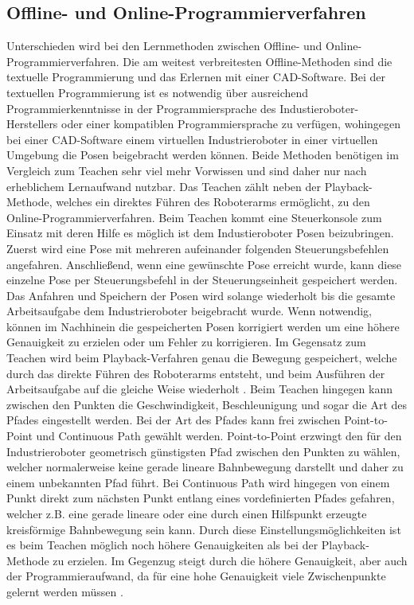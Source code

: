 \subsection{Offline- und Online-Programmierverfahren}
Unterschieden wird bei den Lernmethoden zwischen Offline- und Online-Programmierverfahren. Die am weitest verbreitesten Offline-Methoden sind die textuelle Programmierung und das Erlernen mit einer CAD-Software. Bei der textuellen Programmierung ist es notwendig über ausreichend Programmierkenntnisse in der Programmiersprache des Industieroboter-Herstellers oder einer kompatiblen Programmiersprache zu verfügen, wohingegen bei einer CAD-Software einem virtuellen Industrieroboter in einer virtuellen Umgebung die Posen beigebracht werden können. Beide Methoden benötigen im Vergleich zum Teachen sehr viel mehr Vorwissen und sind daher nur nach erheblichem Lernaufwand nutzbar. Das Teachen zählt neben der Playback-Methode, welches ein direktes Führen des Roboterarms ermöglicht, zu den Online-Programmierverfahren. Beim Teachen kommt eine Steuerkonsole zum Einsatz mit deren Hilfe es möglich ist dem Industieroboter Posen beizubringen. Zuerst wird eine Pose mit mehreren aufeinander folgenden Steuerungsbefehlen angefahren. Anschließend, wenn eine gewünschte Pose erreicht wurde, kann diese einzelne Pose per Steuerungsbefehl in der Steuerungseinheit gespeichert werden. Das Anfahren und Speichern der Posen wird solange wiederholt bis die gesamte Arbeitsaufgabe dem Industrieroboter beigebracht wurde. Wenn notwendig, können im Nachhinein die gespeicherten Posen korrigiert werden um eine höhere Genauigkeit zu erzielen oder um Fehler zu korrigieren. Im Gegensatz zum Teachen wird beim Playback-Verfahren genau die Bewegung gespeichert, welche durch das direkte Führen des Roboterarms entsteht, und beim Ausführen der Arbeitsaufgabe auf die gleiche Weise wiederholt \cite{industrieroboter_2020}. Beim Teachen hingegen kann zwischen den Punkten die Geschwindigkeit, Beschleunigung und sogar die Art des Pfades eingestellt werden. Bei der Art des Pfades kann frei zwischen Point-to-Point und Continuous Path gewählt werden. Point-to-Point erzwingt den für den Industrieroboter geometrisch günstigsten Pfad zwischen den Punkten zu wählen, welcher normalerweise keine gerade lineare Bahnbewegung darstellt und daher zu einem unbekannten Pfad führt. Bei Continuous Path wird hingegen von einem Punkt direkt zum nächsten Punkt entlang eines vordefinierten Pfades gefahren, welcher z.B. eine gerade lineare oder eine durch einen Hilfspunkt erzeugte kreisförmige Bahnbewegung sein kann. Durch diese Einstellungsmöglichkeiten ist es beim Teachen möglich noch höhere Genauigkeiten als bei der Playback-Methode zu erzielen. Im Gegenzug steigt durch die höhere Genauigkeit, aber auch der Programmieraufwand, da für eine hohe Genauigkeit viele Zwischenpunkte gelernt werden müssen \cite{teach-technik_2020}.\\

